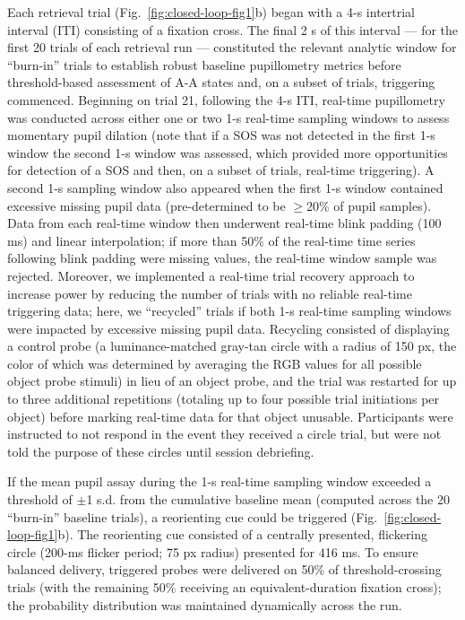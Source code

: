 Each retrieval trial (Fig.~\ref{fig:closed-loop-fig1}b) began with a 4-s intertrial interval (ITI) consisting of a fixation cross. The final 2 s of this interval –– for the first 20 trials of each retrieval run –– constituted the relevant analytic window for ``burn-in'' trials to establish robust baseline pupillometry metrics before threshold-based assessment of A-A states and, on a subset of trials, triggering commenced. Beginning on trial 21, following the 4-s ITI, real-time pupillometry was conducted across either one or two 1-s real-time sampling windows to assess momentary pupil dilation (note that if a SOS was not detected in the first 1-s window the second 1-s window was assessed, which provided more opportunities for detection of a SOS and then, on a subset of trials, real-time triggering). A second 1-s sampling window also appeared when the first 1-s window contained excessive missing pupil data (pre-determined to be $\geq$20\% of pupil samples). Data from each real-time window then underwent real-time blink padding (100 ms) and linear interpolation; if more than 50\% of the real-time time series following blink padding were missing values, the real-time window sample was rejected. Moreover, we implemented a real-time trial recovery approach to increase power by reducing the number of trials with no reliable real-time triggering data; here, we ``recycled'' trials if both 1-s real-time sampling windows were impacted by excessive missing pupil data. Recycling consisted of displaying a control probe (a luminance-matched gray-tan circle with a radius of 150 px, the color of which was determined by averaging the RGB values for all possible object probe stimuli) in lieu of an object probe, and the trial was restarted for up to three additional repetitions (totaling up to four possible trial initiations per object) before marking real-time data for that object unusable. Participants were instructed to not respond in the event they received a circle trial, but were not told the purpose of these circles until session debriefing.

If the mean pupil assay during the 1-s real-time sampling window exceeded a threshold of $\pm$1 s.d. from the cumulative baseline mean (computed across the 20 ``burn-in'' baseline trials), a reorienting cue could be triggered (Fig.~\ref{fig:closed-loop-fig1}b). The reorienting cue consisted of a centrally presented, flickering circle (200-ms flicker period; 75 px radius) presented for 416 ms. To ensure balanced delivery, triggered probes were delivered on 50\% of threshold-crossing trials (with the remaining 50\% receiving an equivalent-duration fixation cross); the probability distribution was maintained dynamically across the run.

